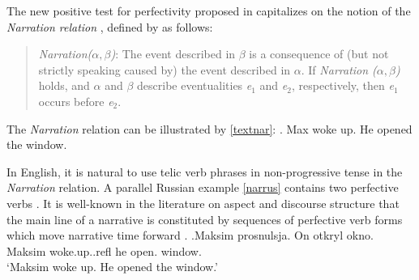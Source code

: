 The new positive test for perfectivity  proposed in \citet{ZinovaFilip:13} capitalizes on the notion of the \textit{Narration relation }, defined by \citet{Lascarides:93} as follows:

\begin{quote}
\textit{Narration($\alpha,\beta$)}: The event described in $\beta$ is a consequence of (but not strictly speaking caused by) the event described in $\alpha$. If \textit{Narration ($\alpha,\beta$)} holds, and $\alpha$ and $\beta$ describe eventualities \textit{e$_1$} and \textit{e$_2$}, respectively, then \textit{e$_1$} occurs before \textit{e$_2$}.
\end{quote}

The \textit{Narration} relation can be illustrated by \ref{textnar}: 
\ex.\label{textnar} Max woke up. He opened the window. 

In English, it is natural to use telic verb phrases in non-progressive tense in the \textit{Narration} relation. A parallel Russian example \ref{narrus} contains two perfective verbs . It is well-known  in the literature on aspect and discourse structure  that the main line of a narrative is constituted by sequences of perfective verb  forms which move narrative time forward \citep[for Russian, see in particular][]{Paducheva:96, Paducheva:04}.
\exg.\label{narrus}Maksim prosnulsja\textsuperscript{\PF}. On otkryl\textsuperscript{\PF} okno.\\
Maksim woke.up..refl he open. window.\\
\trans `Maksim woke up. He opened the window.'

